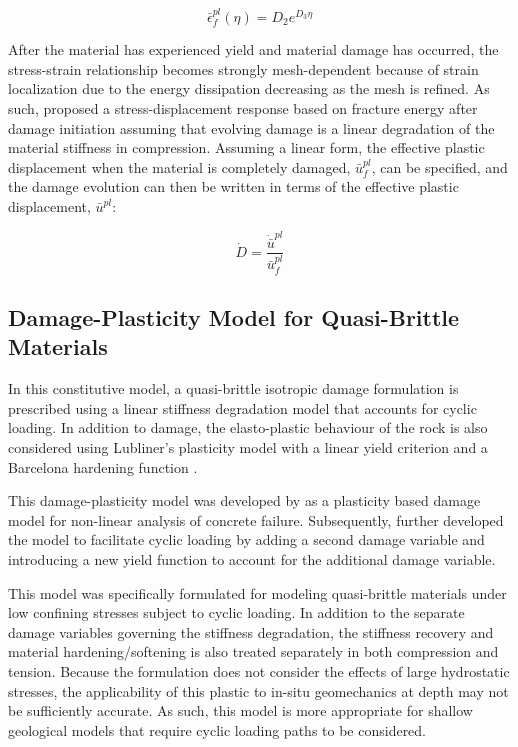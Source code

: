 \begin{equation}
\bar{\epsilon}_{f}^{pl}\left(\eta\right)=D_{2}e^{D_{3}\eta}
\label{eqn:druc4}
\end{equation}

After the material has experienced yield and material damage has occurred, the stress-strain relationship becomes strongly mesh-dependent because of strain localization due to the energy dissipation decreasing as the mesh is refined. As such, \citet{Hillerborg_1976} proposed a stress-displacement response based on fracture energy after damage initiation assuming that evolving damage is a linear degradation of the material stiffness in compression. Assuming a linear form, the effective plastic displacement when the material is completely damaged, $\bar{u}^{pl}_f$, can be specified, and the damage evolution can then be written in terms of the effective plastic displacement, $\bar{u}^{pl}$:

\begin{equation}
\dot{D}=\frac{\dot{\bar{u}}^{pl}}{\bar{u}_{f}^{pl}}
\label{eqn:druc5}
\end{equation}

\subsection{Damage-Plasticity Model for Quasi-Brittle Materials}

In this constitutive model, a quasi-brittle isotropic damage formulation is prescribed using a linear stiffness degradation model that accounts for cyclic loading. In addition to damage, the elasto-plastic behaviour of the rock is also considered using Lubliner's plasticity model with a linear yield criterion and a Barcelona hardening function \citep{lubliner_plastic-damage_1989}. 

This damage-plasticity model was developed by \citet{lubliner_plastic-damage_1989} as a plasticity based damage model for non-linear analysis of concrete failure. Subsequently, \citet{lee_plastic-damage_1998} further developed the model to facilitate cyclic loading by adding a second damage variable and introducing a new yield function to account for the additional damage variable. 

This model was specifically formulated for modeling quasi-brittle materials under low confining stresses subject to cyclic loading. In addition to the separate damage variables governing the stiffness degradation, the stiffness recovery and material hardening/softening is also treated separately in both compression and tension. Because the formulation does not consider the effects of large hydrostatic stresses, the applicability of this plastic to in-situ geomechanics at depth may not be sufficiently accurate. As such, this model is more appropriate for shallow geological models that require cyclic loading paths to be considered.

